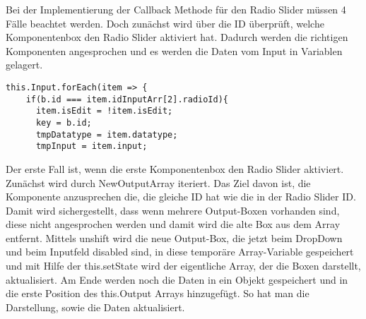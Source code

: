 \documentclass[a4paper,11pt]{scrreprt}
\begin{document}
Bei der Implementierung der Callback Methode für den Radio Slider müssen 4 Fälle beachtet werden. Doch zunächst wird über die ID überprüft, welche Komponentenbox den Radio Slider aktiviert hat. Dadurch werden die richtigen Komponenten angesprochen und es werden die Daten vom Input in Variablen gelagert. 
\begin{lstlisting}
this.Input.forEach(item => {
    if(b.id === item.idInputArr[2].radioId){
      item.isEdit = !item.isEdit;
      key = b.id;
      tmpDatatype = item.datatype;
      tmpInput = item.input;
\end{lstlisting}
Der erste Fall ist, wenn die erste Komponentenbox den Radio Slider aktiviert. 
Zunächst wird durch NewOutputArray iteriert. Das Ziel davon ist, die Komponente anzusprechen die, die gleiche ID hat wie die in der Radio Slider ID. Damit wird sichergestellt, dass wenn mehrere Output-Boxen vorhanden sind, diese nicht angesprochen werden und damit wird die alte Box aus dem Array entfernt. Mittels unshift wird die neue Output-Box, die jetzt beim DropDown und beim Inputfeld disabled sind, in diese temporäre Array-Variable gespeichert und mit Hilfe der this.setState wird der eigentliche Array, der die Boxen darstellt, aktualisiert. Am Ende werden noch die Daten in ein Objekt gespeichert und in die erste Position des this.Output Arrays hinzugefügt. 
So hat man die Darstellung, sowie die Daten aktualisiert.
\end{document}
